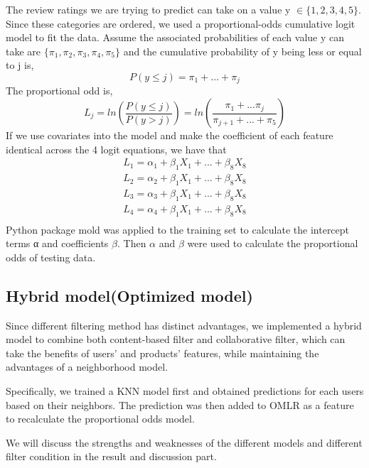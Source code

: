 \documentclass[sigconf]{acmart}
\begin{document}
The review ratings we are trying to predict can take on a value  y $\in\{1,2,3,4,5\}$. Since these categories are ordered, we used a proportional-odds cumulative logit model to fit the data\cite{warner2008ordinal}. Assume the associated probabilities of each value y can take are $\{\pi_1,\pi_2, \pi_3, \pi_4, \pi_5 \}$ and the cumulative probability of y being less or equal to j is, 
\begin{equation}
    P(y\leq j)=\pi_1 + ... + \pi_j
\end{equation}
The proportional odd is, 
\begin{equation}
    L_j = ln(\frac{P(y\leq j)}{P(y > j)}) = ln(\frac{\pi_1+...\pi_j}{\pi_{j+1}+...+\pi_5})
\end{equation}
If we use covariates into the model and make the coefficient of each feature identical across the 4 logit equations, we have that 
\begin{equation}
    \begin{split}
    L_1 = \alpha_1 + \beta_1X_1 + ... + \beta_8X_8\\
    L_2 = \alpha_2 + \beta_1X_1 + ... + \beta_8X_8\\
    L_3 = \alpha_3 + \beta_1X_1 + ... + \beta_8X_8\\
    L_4 = \alpha_4 + \beta_1X_1 + ... + \beta_8X_8\\
    \end{split}
\end{equation}
Python package mold was applied to the training set to calculate the intercept terms α and coefficients $\beta$. Then $\alpha$ and $\beta$ were used to calculate the proportional odds of testing data. 

\subsection{Hybrid model(Optimized model)}
Since different filtering method has distinct advantages, we implemented a hybrid model to combine both content-based filter and collaborative filter, which can take the benefits of users’ and products’ features, while maintaining the advantages of a neighborhood model.\cite{leeprediction}

Specifically, we trained a KNN model first and obtained predictions for each users based on their neighbors. The prediction was then added to OMLR as a feature to recalculate the proportional odds model. 

We will discuss the strengths and weaknesses of the different models and different filter condition in the result and discussion part.
\end{document}
